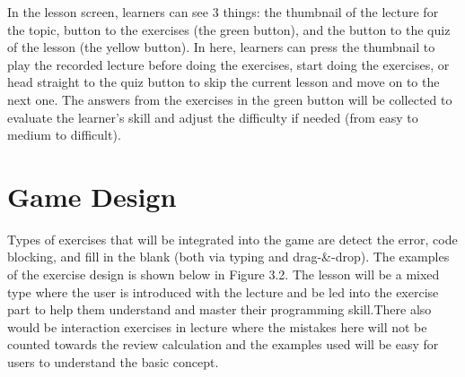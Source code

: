 In the lesson screen, learners can see 3 things: the thumbnail of the lecture for the topic, button to the exercises (the green button), and the button to the quiz of the lesson (the yellow button). In here, learners can press the thumbnail to play the recorded lecture before doing the exercises, start doing the exercises, or head straight to the quiz button to skip the current lesson and move on to the next one. The answers from the exercises in the green button will be collected to evaluate the learner's skill and adjust the difficulty if needed (from easy to medium to difficult).
    
\newpage

\section{Game Design}
Types of exercises that will be integrated into the game are detect the error, code blocking, and fill in the blank (both via typing and drag-\&-drop). The examples of the exercise design is shown below in Figure 3.2. The lesson will be a mixed type where the user is introduced with the lecture and be led into the exercise part to help them understand and master their programming skill.There also would be interaction exercises in lecture where the mistakes here will not be counted towards the review calculation and the examples used will be easy for users to understand the basic concept.
